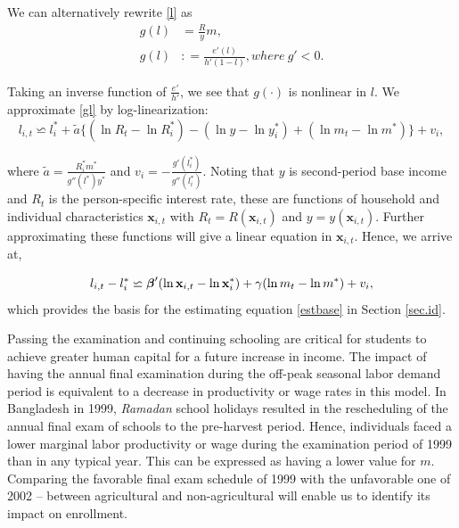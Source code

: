 \documentclass[12pt,letterpaper]{article}\usepackage[margin=1in]{geometry}
\newcommand{\bfbeta}{\ensuremath{\mbox{\boldmath $\beta$}}}
\newcommand{\0}{\ensuremath{\mbox{\boldmath $0$}}}
\newcommand{\defeq}{\mathrel{\mathop:}=}
\begin{document}
We can alternatively rewrite \eqref{l} as
\begin{equation}
\begin{aligned}
g(l)    &=\frac{R}{y}m, \\
g(l)    &\defeq \frac{e'(l)}{h'(1-l)}, where \ g'<0.
\end{aligned}
\label{gl}
\end{equation}

Taking an inverse function of $\frac{e'}{h'}$, we see that $g(\cdot)$ is nonlinear in $l$. We approximate \eqref{gl} by log-linearization:
\[
 l_{i,t}\backsimeq  l^{*}_{i}+\tilde{a}\{(\ln R_{t}-\ln R^{*}_{i}) - (\ln y-\ln y^{*}_{i}) + (\ln m_{t}-\ln m^{*})\} + v_{i},
\]


where $\tilde{a}=\tfrac{R^{*}_{i}m^{*}}{g''(l^{*})y^{*}}$ and $v_{i}=-\tfrac{g'(l^{*}_{i})}{g''(l^{*}_{i})}$. Noting that $y$ is second-period base income and $R_{t}$ is the person-specific interest rate, these are functions of household and individual characteristics $\textbf{x}_{i,t}$ with $R_{t}=R(\textbf{x}_{i,t})$ and $y=y(\textbf{x}_{i,t})$. Further approximating these functions will give a linear equation in $\textbf{x}_{i,t}$. Hence, we arrive at,

\begin{equation}
 l_{i,t}- l^{*}_{i}\backsimeq \bfbeta'(\ln \textbf{x}_{i,t}-\ln \textbf{x}^{*}_{i}) + \gamma(\ln m_{t}-\ln m^{*}) + v_{i},
 \label{lsimeq}
\end{equation}
which provides the basis for the estimating equation \eqref{estbase} in Section \ref{sec.id}.

Passing the examination and continuing schooling are critical for students to achieve greater human capital for a future increase in income. The impact of having the annual final examination during the off-peak seasonal labor demand period is equivalent to a decrease in productivity or wage rates in this model. In Bangladesh in 1999, \textit{Ramadan} school holidays resulted in the rescheduling of the annual final exam of schools to the pre-harvest period. Hence, individuals faced a lower marginal labor productivity or wage during the examination period of 1999 than in any typical year. This can be expressed as having a lower value for $m$. Comparing the favorable final exam schedule of 1999 with the unfavorable one of 2002 -- between agricultural and non-agricultural will enable us to identify its impact on enrollment.

\end{document}
